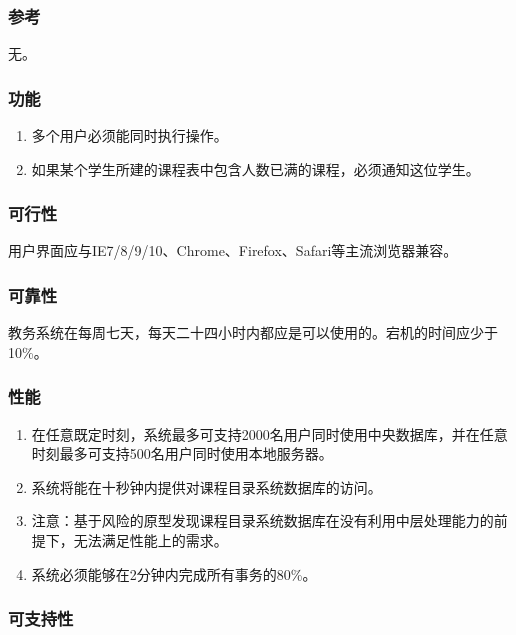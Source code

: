 \subsubsection{参考}
无。
  
\subsubsection{功能}
  
  \begin{enumerate}
    \item 多个用户必须能同时执行操作。
    \item 如果某个学生所建的课程表中包含人数已满的课程，必须通知这位学生。
  \end{enumerate}
  
\subsubsection{可行性}
  
用户界面应与IE7/8/9/10、Chrome、Firefox、Safari等主流浏览器兼容。
  
\subsubsection{可靠性}
  
教务系统在每周七天，每天二十四小时内都应是可以使用的。宕机的时间应少于10\%。
  
\subsubsection{性能}
  
  \begin{enumerate}
    \item 在任意既定时刻，系统最多可支持2000名用户同时使用中央数据库，并在任意时刻最多可支持500名用户同时使用本地服务器。
    \item 系统将能在十秒钟内提供对课程目录系统数据库的访问。
    \item 注意：基于风险的原型发现课程目录系统数据库在没有利用中层处理能力的前提下，无法满足性能上的需求。
    \item 系统必须能够在2分钟内完成所有事务的80\%。
  \end{enumerate}
  
\subsubsection{可支持性}
  
